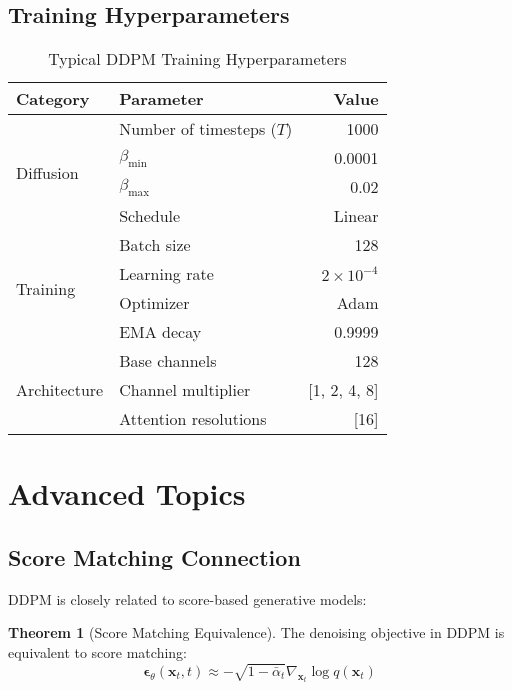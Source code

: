 \documentclass[11pt,a4paper]{article}
\theoremstyle{definition}
\newtheorem{theorem}{Theorem}[section]
\begin{document}
\subsection{Training Hyperparameters}

\begin{table}[H]
\centering
\caption{Typical DDPM Training Hyperparameters}
\label{tab:hyperparams}
\begin{tabular}{@{}llr@{}}
\toprule
\textbf{Category} & \textbf{Parameter} & \textbf{Value} \\
\midrule
\multirow{4}{*}{Diffusion} & Number of timesteps ($T$) & 1000 \\
& $\beta_{\min}$ & 0.0001 \\
& $\beta_{\max}$ & 0.02 \\
& Schedule & Linear \\
\midrule
\multirow{4}{*}{Training} & Batch size & 128 \\
& Learning rate & $2 \times 10^{-4}$ \\
& Optimizer & Adam \\
& EMA decay & 0.9999 \\
\midrule
\multirow{3}{*}{Architecture} & Base channels & 128 \\
& Channel multiplier & [1, 2, 4, 8] \\
& Attention resolutions & [16] \\
\bottomrule
\end{tabular}
\end{table}

\section{Advanced Topics}

\subsection{Score Matching Connection}

DDPM is closely related to score-based generative models:

\begin{theorem}[Score Matching Equivalence]
The denoising objective in DDPM is equivalent to score matching:
\begin{equation}
    \bm{\epsilon}_\theta(\mathbf{x}_t, t) \approx -\sqrt{1-\bar{\alpha}_t} \nabla_{\mathbf{x}_t} \log q(\mathbf{x}_t)
\end{equation}
\end{theorem}
\end{document}

